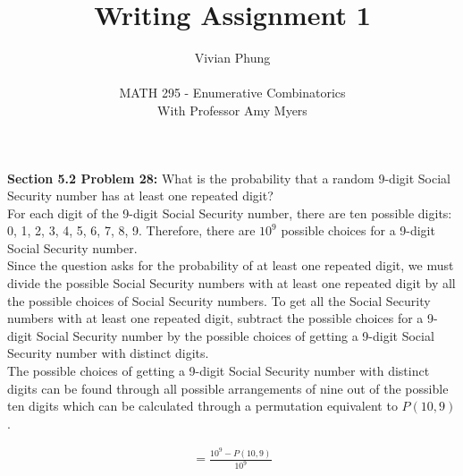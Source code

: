 \documentclass[12pt]{article}
\begin{document}
 
 
 
\title{Writing Assignment 1}%
\author{Vivian Phung\\ \\ %
MATH 295 - Enumerative Combinatorics\\With Professor Amy Myers} 

\maketitle
\textbf{Section 5.2 Problem 28:} What is the probability that a random 9-digit Social Security number has at least one repeated digit? \\

For each digit of the 9-digit Social Security number, there are ten possible digits: 0, 1, 2, 3, 4, 5, 6, 7, 8, 9. Therefore, there are $10^9$ possible choices for a 9-digit Social Security number. \\

Since the question asks for the probability of at least one repeated digit, we must divide the possible Social Security numbers with at least one repeated digit by all the possible choices of Social Security numbers. To get all the Social Security numbers with at least one repeated digit, subtract the possible choices for a 9-digit Social Security number by the possible choices of getting a 9-digit Social Security number with distinct digits.\\

The possible choices of getting a 9-digit Social Security number with distinct digits can be found through all possible arrangements of nine out of the possible ten digits which can be calculated through a permutation equivalent to $P(10, 9)$.

\begin{align*}
= \frac{10^9 - P(10, 9)}{10^9}
\end{align*}


 
 
\end{document}
